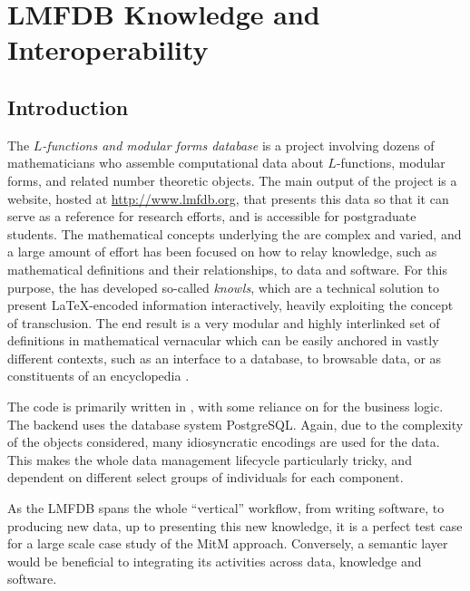 \section{LMFDB Knowledge and Interoperability}\label{sec:lmfdb}
\subsection{Introduction}
The \emph{$L$-functions and modular forms database} is a project involving dozens of
mathematicians who assemble computational data about $L$-functions, modular forms, and
related number theoretic objects. The main output of the project is a website, hosted at
\url{http://www.lmfdb.org}, that presents this data so that it can serve as a
reference for research efforts, and is accessible for postgraduate students.
The mathematical concepts underlying the \LMFDB are complex and varied, and a large amount of effort has been focused on how to relay knowledge, such as mathematical definitions
and their relationships, to data and software. For this purpose, the \LMFDB has developed so-called
\emph{knowls}, which are a technical solution to present \LaTeX-encoded information
interactively, heavily exploiting the concept of transclusion. The end result is a
very modular and highly interlinked set of definitions in mathematical vernacular
which can be easily anchored in vastly different contexts, such as an interface to a database,
to browsable data, or as constituents of an encyclopedia \cite{lmfdb-definitions}.

The \LMFDB code is primarily written in \Python, with some reliance on \Sage for
the business logic. The backend
uses the database system PostgreSQL. Again, due to the
complexity of the objects considered, many idiosyncratic encodings are used for the
data. This makes the whole data management lifecycle particularly tricky, and dependent on
different select groups of individuals for each component.

As the LMFDB spans the whole ``vertical'' workflow, from writing software, to producing new
data, up to presenting this new knowledge, it is a perfect test case for a large scale
case study of the MitM approach. Conversely, a semantic layer would be beneficial to integrating its
activities across data, knowledge and software.

